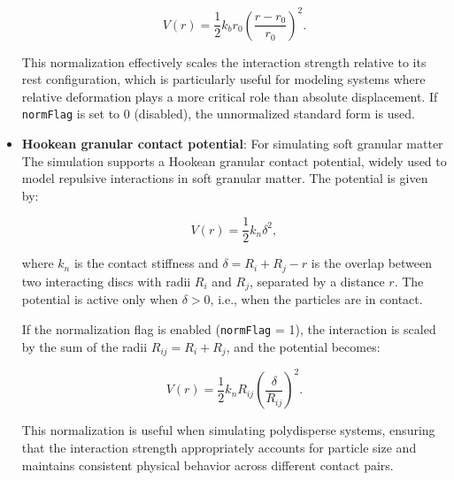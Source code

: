 \documentclass[a4paper,10pt]{article}
\begin{document}
\begin{itemize}
\[
V(r) = \frac{1}{2}k_b r_0 \left( \frac{r - r_0}{r_0} \right)^2.
\]

This normalization effectively scales the interaction strength relative to its rest configuration, which is particularly 
useful for modeling systems where relative deformation plays a more critical role than absolute displacement. If 
\texttt{normFlag} is set to 0 (disabled), the unnormalized standard form is used.



\item \textbf{Hookean granular contact potential}: For simulating soft granular matter
The simulation supports a Hookean granular contact potential, widely used to model repulsive interactions in soft granular 
matter. The potential is given by:

\[
V(r) = \frac{1}{2}k_n \delta^2,
\]

where \( k_n \) is the contact stiffness and \( \delta = R_i + R_j - r \) is the overlap between two interacting discs 
with radii \( R_i \) and \( R_j \), separated by a distance \( r \). The potential is active only when \( \delta > 0 \), 
i.e., when the particles are in contact.

If the normalization flag is enabled (\texttt{normFlag} = 1), the interaction is scaled by the sum of the radii 
\( R_{ij} = R_i + R_j \), and the potential becomes:

\[
V(r) = \frac{1}{2} k_n R_{ij} \left(\frac{\delta}{R_{ij}}\right)^2.
\]

This normalization is useful when simulating polydisperse systems, ensuring that the interaction strength appropriately 
accounts for particle size and maintains consistent physical behavior across different contact pairs.


\end{itemize}
\end{document}
